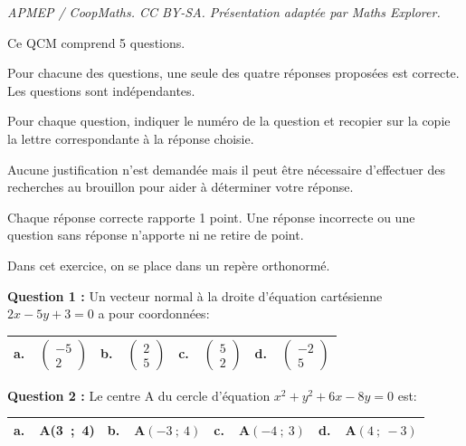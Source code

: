 \documentclass[10pt]{article}
\begin{document}
\noindent\textit{APMEP / CoopMaths. CC BY-SA. Présentation adaptée par Maths Explorer.}\par\medskip
\medskip


Ce QCM comprend 5 questions.

Pour chacune des questions, une seule des quatre réponses proposées est correcte.
Les questions sont indépendantes.

Pour chaque question, indiquer le numéro de la question et recopier sur la copie la lettre correspondante à la réponse choisie.

Aucune justification n'est demandée mais il peut être nécessaire d'effectuer des recherches au brouillon pour aider à déterminer votre réponse.

Chaque réponse correcte rapporte 1 point. Une réponse incorrecte ou une question sans réponse n'apporte ni ne retire de point.

Dans cet exercice, on se place dans un repère orthonormé.

\medskip


\textbf{Question 1 :} Un vecteur normal à la droite d'équation cartésienne $2x - 5y + 3 = 0$ a pour coordonnées:

\begin{center}
\begin{tabularx}{\linewidth}{|*{4}{X|}}\hline
\textbf{a.~~}$\begin{pmatrix}-5\\2 \end{pmatrix}$&\textbf{b.~~}$\begin{pmatrix}2\\5 \end{pmatrix}$&\textbf{c.~~}$\begin{pmatrix}5\\2 \end{pmatrix}$&\textbf{d.~~}$\begin{pmatrix}-2\\5 \end{pmatrix}$\\ \hline
\end{tabularx}
\end{center}

\textbf{Question 2 :} Le centre A du cercle d'équation $x^2+y^2 + 6x - 8y = 0$ est:

\begin{center}
\begin{tabularx}{\linewidth}{|*{4}{X|}}\hline
\textbf{a.~~}A(3~;~4)&\textbf{b.~~}A$(-3~;~4)$&\textbf{c.~~}A$(-4~;~3)$&\textbf{d.~~}A$(4~;~-3)$\\ \hline
\end{tabularx}
\end{center}
\end{document}
